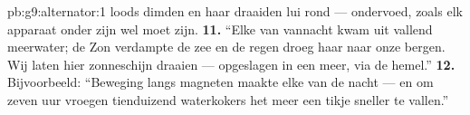 \begin{solution}{pb:g9:alternator:1}
loods dimden en haar  draaiden lui rond --- ondervoed,
zoals elk apparaat onder zijn  wel moet zijn.
\textbf{11.} ``Elke  van vannacht kwam uit vallend
meerwater; de Zon verdampte de zee en de regen droeg haar naar onze
bergen. Wij laten hier zonneschijn draaien --- opgeslagen in een meer,
via de hemel.''
\textbf{12.} Bijvoorbeeld: ``Beweging langs magneten maakte elke
 van de nacht --- en om zeven uur vroegen tienduizend
waterkokers het meer een tikje sneller te vallen.''
\end{solution}
